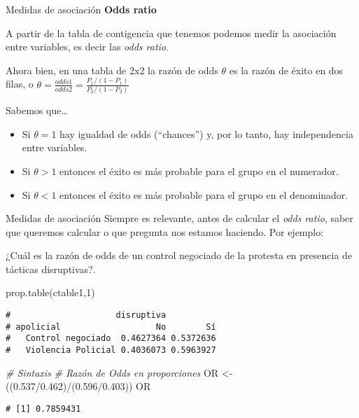 \documentclass[
  8pt,
  ignorenonframetext,
]{beamer}
\newenvironment{Shaded}{\begin{snugshade}}{\end{snugshade}}
\newcommand{\CommentTok}[1]{\textcolor[rgb]{0.56,0.35,0.01}{\textit{#1}}}
\newcommand{\DecValTok}[1]{\textcolor[rgb]{0.00,0.00,0.81}{#1}}
\newcommand{\FloatTok}[1]{\textcolor[rgb]{0.00,0.00,0.81}{#1}}
\newcommand{\FunctionTok}[1]{\textcolor[rgb]{0.00,0.00,0.00}{#1}}
\newcommand{\NormalTok}[1]{#1}
\newcommand{\OtherTok}[1]{\textcolor[rgb]{0.56,0.35,0.01}{#1}}
\newcommand{\SpecialCharTok}[1]{\textcolor[rgb]{0.00,0.00,0.00}{#1}}
\begin{document}
\begin{frame}{Medidas de asociación}
\protect\hypertarget{medidas-de-asociaciuxf3n-7}{}
\textbf{Odds ratio}

A partir de la tabla de contigencia que tenemos podemos medir la
asociación entre variables, es decir las \emph{odds ratio}.

Ahora bien, en una tabla de 2x2 la razón de odds \(\theta\) es la razón
de éxito en dos ﬁlas, o
\(\theta= \frac{odds1}{odds2}=\frac{P_1/(1-P_1)}{P_2/(1-P_2)}\)

Sabemos que\ldots{}

\begin{itemize}
\item
  Si \(\theta=1\) hay igualdad de odds (``chances'') y, por lo tanto,
  hay independencia entre variables.
\item
  Si \(\theta > 1\) entonces el éxito es más probable para el grupo en
  el numerador.
\item
  Si \(\theta < 1\) entonces el éxito es más probable para el grupo en
  el denominador.
\end{itemize}
\end{frame}

\begin{frame}[fragile]{Medidas de asociación}
\protect\hypertarget{medidas-de-asociaciuxf3n-8}{}
Siempre es relevante, antes de calcular el \emph{odds ratio}, saber que
queremos calcular o que pregunta nos estamos haciendo. Por ejemplo:

¿Cuál es la razón de odds de un control negociado de la protesta en
presencia de tácticas disruptivas?.

\begin{Shaded}
\begin{Highlighting}[]
\FunctionTok{prop.table}\NormalTok{(ctable1,}\DecValTok{1}\NormalTok{)}
\end{Highlighting}
\end{Shaded}

\begin{verbatim}
#                     disruptiva
# apolicial                   No        Sí
#   Control negociado  0.4627364 0.5372636
#   Violencia Policial 0.4036073 0.5963927
\end{verbatim}

\begin{Shaded}
\begin{Highlighting}[]
\CommentTok{\# Sintaxis}
\CommentTok{\# Razón de Odds en proporciones }
\NormalTok{OR }\OtherTok{\textless{}{-}}\NormalTok{ ((}\FloatTok{0.537}\SpecialCharTok{/}\FloatTok{0.462}\NormalTok{)}\SpecialCharTok{/}\NormalTok{(}\FloatTok{0.596}\SpecialCharTok{/}\FloatTok{0.403}\NormalTok{)) }
\NormalTok{OR}
\end{Highlighting}
\end{Shaded}

\begin{verbatim}
# [1] 0.7859431
\end{verbatim}
\end{frame}
\end{document}
